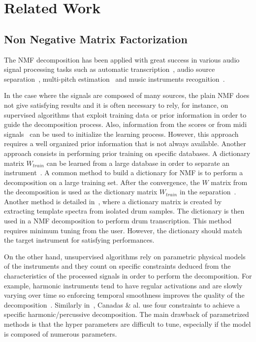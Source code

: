 \section{Related Work}
\label{sec:Background}


\subsection{Non Negative Matrix Factorization}

The NMF decomposition has been applied with great success in various audio signal processing tasks such as automatic transcription~\cite{EwertM12,NB:ICASSP-07}, audio source separation~\cite{HennequinDAFx2010,JLD:TASLP10}, multi-pitch estimation~\cite{raczynski2007multipitch} and music instruments recognition~\cite{cichocki2009nonnegative}.

In the case where the signals are composed of many sources, the plain NMF does not give satisfying results and it is often necessary to rely, for instance, on supervised algorithms that exploit training data or prior information in order to guide the decomposition process. Also, information from the scores or from midi signals~\cite{EwertM12} can be used to initialize the learning process. However, this approach requires a well organized prior information that is not always available. Another approach consists in performing prior training on specific databases. A dictionary matrix $W_{train}$ can be learned from a large database in order to separate an instrument~\cite{jaureguiberry2011adaptation,wudrum}. A common method to build a dictionary for NMF is to perform a decomposition on a large training set. After the convergence, the $W$ matrix from the decomposition is used as the dictionary matrix $W_{train}$ in the separation~\cite{jaureguiberry2011adaptation}. Another method is detailed in~\cite{wudrum}, where a dictionary matrix is created by extracting template spectra from isolated drum samples. The dictionary is then used in a NMF decomposition to perform drum transcription. This method requires minimum tuning from the user. However, the dictionary should match the target instrument for satisfying performances. 

On the other hand, unsupervised algorithms rely on parametric physical models of the instruments and they count on specific constraints deduced from the characteristics of the processed signals in order to perform the decomposition. For example, harmonic instruments tend to have regular activations and are slowly varying over time so enforcing temporal smoothness improves the quality of the decomposition~\cite{Virtanen}. Similarly in~\cite{canadas2014percussive}, Canadas \& al. use four constraints to achieve a specific harmonic/percussive decomposition. The main drawback of parametrized methods is that the hyper parameters are difficult to tune, especially if the model is composed of numerous parameters. 

